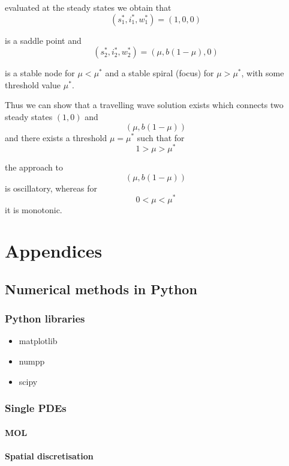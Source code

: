 \documentclass[
  letterpaper,
  DIV=11,
  numbers=noendperiod]{scrreprt}
\providecommand{\tightlist}{%
  \setlength{\itemsep}{0pt}\setlength{\parskip}{0pt}}\usepackage{longtable,booktabs,array}
\theoremstyle{plain}
\theoremstyle{definition}
\theoremstyle{plain}
\theoremstyle{remark}
\begin{document}
evaluated at the steady states we obtain that \[
 (s^\ast_1, i^\ast_1, w^\ast_1) = (1,0,0)
\]

is a saddle point and \[
 (s^\ast_2, i^\ast_2, w^\ast_2) = (\mu, b(1-\mu),0)
\]

is a stable node for \(\mu < \mu^\ast\) and a stable spiral (focus) for
\(\mu >\mu^\ast\), with some threshold value \(\mu^\ast\).

Thus we can show that a travelling wave solution exists which connects
two steady states \((1,0)\) and\\
\[
 (\mu, b(1-\mu))
\] and there exists a threshold \(\mu=\mu^\ast\) such that for \[
 1>\mu > \mu^\ast
\]

the approach to \[
 (\mu, b(1-\mu))
\] is oscillatory, whereas for \[
 0<\mu < \mu^\ast
\] it is monotonic.

\part{Appendices}

\hypertarget{numerical-methods-in-python}{%
\chapter{Numerical methods in
Python}\label{numerical-methods-in-python}}

\hypertarget{python-libraries}{%
\section{Python libraries}\label{python-libraries}}

\begin{itemize}
\tightlist
\item
  matplotlib
\item
  numpp
\item
  scipy
\end{itemize}

\hypertarget{single-pdes}{%
\section{Single PDEs}\label{single-pdes}}

\hypertarget{mol}{%
\subsection{MOL}\label{mol}}

\hypertarget{spatial-discretisation}{%
\subsection{Spatial discretisation}\label{spatial-discretisation}}
\end{document}
